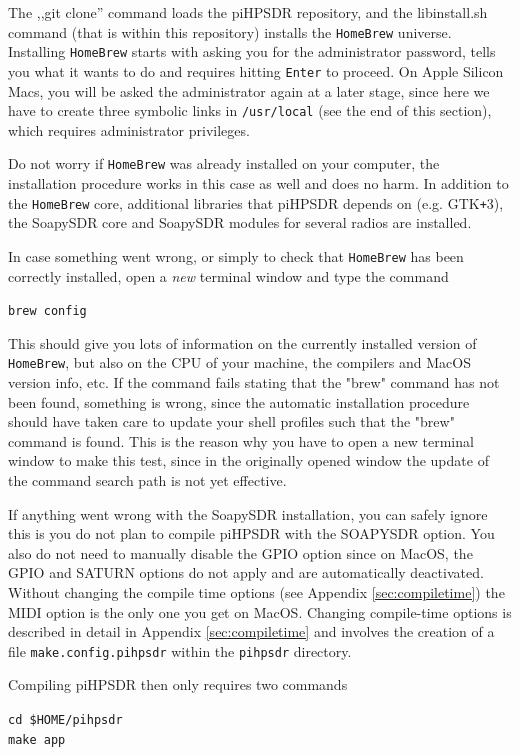 \documentclass[12pt]{book}
\def\grtt#1{\texttt{\color{magenta}#1}}
\def\pH{pi\-HPSDR\xspace}
\begin{document}
The ,,git clone'' command loads the \pH repository, and the libinstall.sh command (that is
within this repository) installs the
 \texttt{HomeBrew} universe. Installing \texttt{HomeBrew} starts with asking you for the administrator
 password, tells you what it wants to do and requires hitting \texttt{Enter} to proceed.
 On Apple Silicon Macs, you will be asked the administrator again at a later stage,
 since here we have to create three symbolic links in \texttt{/usr/local} (see the end of this section),
which requires administrator privileges.

Do not worry if \texttt{HomeBrew} was already installed on your computer, the installation
procedure works in this case as well and does no harm. In addition to
 the \texttt{HomeBrew} core, additional libraries that \pH depends on (e.g. GTK\texttt{+}3), the SoapySDR
 core and SoapySDR modules for several radios are installed.

 In case something went wrong, or simply to check that \texttt{HomeBrew} has been correctly installed,
 open a \textit{new} terminal window and type the command


\grtt{brew config}

 This should give you lots of information on the currently installed version of \texttt{HomeBrew},
 but also on the CPU of your machine, the compilers and MacOS version info, etc. If the command
 fails stating that the "brew" command has not been found, something is wrong, since the automatic
 installation procedure should have taken care to update your shell profiles such that the "brew"
 command is found. This is the reason why you have to open a new terminal window to make this test,
 since in the originally opened window the update of the command search path is not yet effective.

If anything went wrong with the SoapySDR installation, you can safely ignore this is
you do not plan to compile \pH with the SOAPYSDR option. You also do not need
to manually disable the GPIO option since on MacOS, the GPIO and SATURN options
do not apply and are automatically deactivated. Without changing the compile time
options (see Appendix \ref{sec:compiletime}) the MIDI option is the only one you get
on MacOS. Changing compile-time options is described in detail in Appendix \ref{sec:compiletime}
and involves the creation of a file \texttt{make.config.pihpsdr} within the \texttt{pihpsdr}
directory.

Compiling \pH then only requires two commands

\grtt{cd \$HOME/pihpsdr} \\
\grtt{make app}
\end{document}
